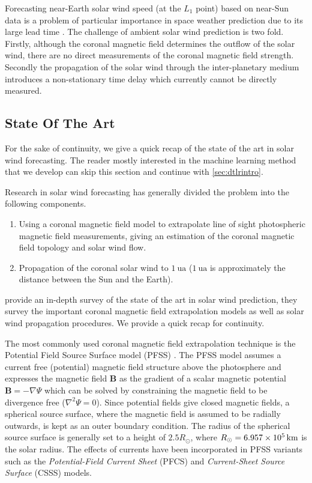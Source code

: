 Forecasting near-Earth solar wind speed (at the $L_1$ point) based on near-Sun data is a problem of 
particular importance in space weather prediction due to its large lead time 
\citep{doi:10.1002/jgra.50429,doi:10.1029/2009SW000542}. The challenge of ambient solar wind 
prediction is two fold. Firstly, although the coronal magnetic field determines the outflow of the 
solar wind, there are no direct measurements of the coronal magnetic field strength. Secondly the 
propagation of the solar wind through the inter-planetary medium introduces a non-stationary time 
delay which currently cannot be directly measured. 

\subsection{State Of The Art}\label{sec:solarwindsota}
For the sake of continuity, we give a quick recap of the state of the art in solar wind 
forecasting. The reader mostly interested in the machine learning method that we develop can skip 
this section and continue with \cref{sec:dtlrintro}.  

Research in solar wind forecasting has generally divided the problem into the following components.
%
\begin{enumerate} 
  \item Using a coronal magnetic field model to extrapolate line of sight photospheric magnetic 
        field measurements, giving an estimation of the coronal magnetic field topology and 
        solar wind flow.
  \item Propagation of the coronal solar wind to $\SI{1}{\astronomicalunit}$ 
        ($\SI{1}{\astronomicalunit}$ is approximately the distance between the Sun and the Earth).
\end{enumerate} 
%
\citet{Reiss_2019} provide an in-depth survey of the state of the art in solar wind prediction, 
they survey the important coronal magnetic field extrapolation models as well as solar wind 
propagation procedures. We provide a quick recap for continuity.

The most commonly used coronal magnetic field extrapolation technique is the Potential Field Source 
Surface model (PFSS) \citep{altschuler1969magnetic,schatten1969model}. The PFSS model assumes a 
current free (potential) magnetic field structure above the photosphere and expresses the magnetic 
field $\mathbf{B}$ as the gradient of a scalar magnetic potential $\mathbf{B} = -\nabla \Psi$ which 
can be solved by constraining the magnetic field to be divergence free ($\nabla^{2}\Psi = 0$). 
Since potential fields give closed magnetic fields, a spherical source surface, where the magnetic 
field is assumed to be radially outwards, is kept as an outer boundary condition. The radius of the 
spherical source surface is generally set to a height of 
$2.5 R_{\odot}$, where $R_{\odot} = \SI{6.957d5}{\kilo\metre}$ is the solar radius. The effects of 
currents have been incorporated in PFSS variants such as the \emph{Potential-Field Current Sheet} 
(PFCS) \citep{schatten1971current} and \emph{Current-Sheet Source Surface} (CSSS) \citep{csss} 
models. 

